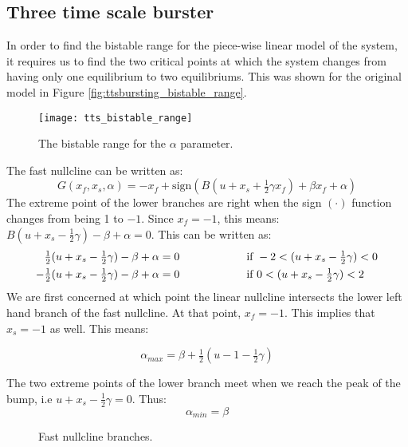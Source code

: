 \documentclass[a4paper, 12pt]{article}
\begin{document}
\begin{appendices}
\section{Three time scale burster}

In order to find the bistable range for the piece-wise linear model of the system, it requires us to find the two critical points at which the system changes from having only one equilibrium to two equilibriums. This was shown for the original model in Figure \ref{fig:ttsbursting_bistable_range}. 

\begin{figure}[h!]
\texttt{[image: tts\_bistable\_range]}
\caption{The bistable range for the $\alpha$ parameter.}
\end{figure}

The fast nullcline can be written as:
\begin{equation}
G(x_f, x_s, \alpha) = - x_f + \text{sign}\left(B\left(u+x_s + \tfrac{1}{2}\gamma x_f\right) + \beta x_f + \alpha \right)
\end{equation}
The extreme point of the lower branches are right when the sign $(\cdot)$ function changes from being 1 to $-1$. Since $x_f = -1$, this means: $B(u + x_s -\tfrac{1}{2}\gamma) -\beta + \alpha = 0$. This can be written as:
\begin{align}
\tfrac{1}{2}(u + x_s -\tfrac{1}{2}\gamma) - \beta + \alpha &= 0 \text{\hspace{2cm} if } -2< (u +  x_s -\tfrac{1}{2}\gamma)<0 \\
-\tfrac{1}{2}(u + x_s -\tfrac{1}{2}\gamma) - \beta + \alpha &= 0 \text{\hspace{2cm} if } 0< (u +  x_s -\tfrac{1}{2}\gamma)<2 \\
\end{align}
We are first concerned at which point the linear nullcline intersects the lower left hand branch of the fast nullcline. At that point, $x_f = -1$. This implies that $x_s = -1$  as well. This means:

\begin{equation}
\alpha_{max} = \beta + \tfrac{1}{2}(u-1-\tfrac{1}{2}\gamma)
\end{equation}

The two extreme points of the lower branch meet when we reach the peak of the bump, i.e $u + x_s - \tfrac{1}{2}\gamma = 0$. Thus:
\begin{equation}
\alpha_{min} = \beta
\end{equation}

\begin{figure}[h!]
\caption{Fast nullcline branches.}
\end{figure}

\end{appendices}
\end{document}
